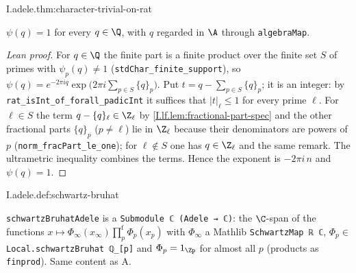 \begin{theorem}
\end{theorem}
\begin{tfformal}{I.adele.thm:character-trivial-on-rat}
\begin{tffidelity}
$\psi(q)=1$ for every $q\in\Q$, with $q$ regarded in $\A$ through \texttt{algebraMap}.
\end{tffidelity}
\end{tfformal}
\begin{proof}[Lean proof]
For $q\in\Q$ the finite part is a finite product over the finite set $S$ of primes with $\psi_p(q)\ne1$ (\texttt{stdChar\_finite\_support}), so $\psi(q)=e^{-2\pi iq}\exp\bigl(2\pi i\sum_{p\in S}\{q\}_p\bigr)$. Put $t=q-\sum_{p\in S}\{q\}_p$; it is an integer: by \texttt{rat\_isInt\_of\_forall\_padicInt} it suffices that $|t|_\ell\le1$ for every prime $\ell$. For $\ell\in S$ the term $q-\{q\}_\ell\in\Z_\ell$ by \cref{I.lf.lem:fractional-part-spec} and the other fractional parts $\{q\}_p$ ($p\ne\ell$) lie in $\Z_\ell$ because their denominators are powers of $p$ (\texttt{norm\_fracPart\_le\_one}); for $\ell\notin S$ one has $q\in\Z_\ell$ and the same remark. The ultrametric inequality combines the terms. Hence the exponent is $-2\pi i\,n$ and $\psi(q)=1$.
\end{proof}

\begin{definition}
\end{definition}
\begin{tfformal}{I.adele.def:schwartz-bruhat}
\begin{tffidelity}
\texttt{schwartzBruhatAdele} is a \texttt{Submodule ℂ (Adele → ℂ)}: the $\C$-span of the functions $x\mapsto\Phi_\infty(x_\infty)\prod^{\mathrm f}_p\Phi_p(x_p)$ with $\Phi_\infty$ a Mathlib \texttt{SchwartzMap ℝ ℂ}, $\Phi_p\in$ \texttt{Local.schwartzBruhat ℚ\_[p]} and $\Phi_p=1_{\Zp}$ for almost all $p$ (products as \texttt{finprod}). Same content as A.
\end{tffidelity}
\end{tfformal}

